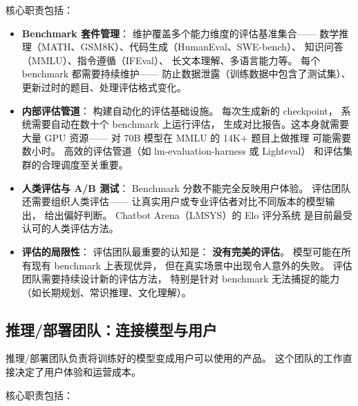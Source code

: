 核心职责包括：

\begin{itemize}[noitemsep]
  \item \textbf{Benchmark 套件管理}：
        维护覆盖多个能力维度的评估基准集合——
        数学推理（MATH、GSM8K）、代码生成（HumanEval、SWE-bench）、
        知识问答（MMLU）、指令遵循（IFEval）、
        长文本理解、多语言能力等。
        每个 benchmark 都需要持续维护——
        防止数据泄露（训练数据中包含了测试集）、
        更新过时的题目、处理评估格式变化。
  \item \textbf{内部评估管道}：
        构建自动化的评估基础设施。
        每次生成新的 checkpoint，
        系统需要自动在数十个 benchmark 上运行评估，
        生成对比报告。这本身就需要大量 GPU 资源——
        对 70B 模型在 MMLU 的 14K+ 题目上做推理
        可能需要数小时。
        高效的评估管道（如 lm-evaluation-harness 或 Lighteval）
        和评估集群的合理调度至关重要。
  \item \textbf{人类评估与 A/B 测试}：
        Benchmark 分数不能完全反映用户体验。
        评估团队还需要组织人类评估——
        让真实用户或专业评估者对比不同版本的模型输出，
        给出偏好判断。
        Chatbot Arena（LMSYS）的 Elo 评分系统
        是目前最受认可的人类评估方法。
  \item \textbf{评估的局限性}：
        评估团队最重要的认知是：
        \textbf{没有完美的评估}。
        模型可能在所有现有 benchmark 上表现优异，
        但在真实场景中出现令人意外的失败。
        评估团队需要持续设计新的评估方法，
        特别是针对 benchmark 无法捕捉的能力
        （如长期规划、常识推理、文化理解）。
\end{itemize}

\subsection{推理/部署团队：连接模型与用户}

推理/部署团队负责将训练好的模型变成用户可以使用的产品。
这个团队的工作直接决定了用户体验和运营成本。

核心职责包括：

